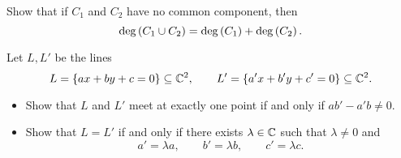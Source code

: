 \begin{exercise}
Show that if $ C_1 $ and $ C_2 $ have no common component, then
$$ \deg\left( C_1 \cup C_2 \right) = \deg\left( C_1 \right) + \deg\left( C_2 \right). $$
\end{exercise}

\begin{exercise}
Let $ L, L' $ be the lines
$$ L = \left\{ ax + by + c = 0 \right\} \subseteq \mathbb{C}^2, \qquad L' = \left\{ a'x + b'y + c' = 0 \right\} \subseteq \mathbb{C}^2. $$
\begin{itemize}
\item Show that $ L $ and $ L' $ meet at exactly one point if and only if $ ab' - a'b \ne 0 $.
\item Show that $ L = L' $ if and only if there exists $ \lambda \in \mathbb{C} $ such that $ \lambda \ne 0 $ and
$$ a' = \lambda a, \qquad b' = \lambda b, \qquad c' = \lambda c. $$
\end{itemize}
\end{exercise}

